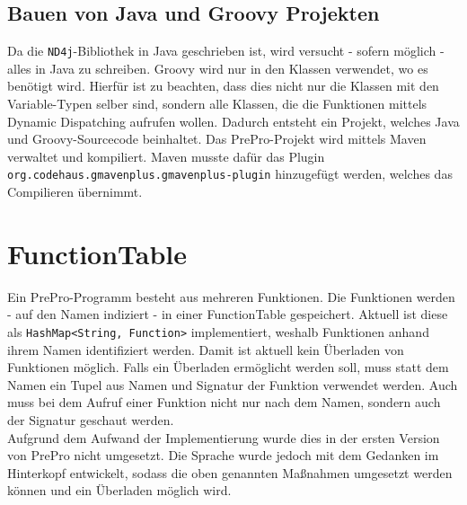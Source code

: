 \subsection{Bauen von Java und Groovy Projekten}
Da die \texttt{ND4j}-Bibliothek in Java geschrieben ist, wird versucht - sofern möglich - alles in Java zu schreiben.
Groovy wird nur in den Klassen verwendet, wo es benötigt wird.
Hierfür ist zu beachten, dass dies nicht nur die Klassen mit den Variable-Typen selber sind, sondern alle Klassen, die die Funktionen mittels Dynamic Dispatching aufrufen wollen.
Dadurch entsteht ein Projekt, welches Java und Groovy-Sourcecode beinhaltet.
Das PrePro-Projekt wird mittels Maven verwaltet und kompiliert.
Maven musste dafür das Plugin \texttt{org.codehaus.gmavenplus.gmavenplus-plugin} hinzugefügt werden, welches das Compilieren übernimmt.

\section{FunctionTable}
Ein PrePro-Programm besteht aus mehreren Funktionen.
Die Funktionen werden - auf den Namen indiziert - in einer FunctionTable gespeichert.
Aktuell ist diese als \texttt{HashMap<String, Function>} implementiert, weshalb Funktionen anhand ihrem Namen identifiziert werden. 
Damit ist aktuell kein Überladen von Funktionen möglich.
Falls ein Überladen ermöglicht werden soll, muss statt dem Namen ein Tupel aus Namen und Signatur der Funktion verwendet werden.
Auch muss bei dem Aufruf einer Funktion nicht nur nach dem Namen, sondern auch der Signatur geschaut werden.\\
Aufgrund dem Aufwand der Implementierung wurde dies in der ersten Version von PrePro nicht umgesetzt.
Die Sprache wurde jedoch mit dem Gedanken im Hinterkopf entwickelt, sodass die oben genannten Maßnahmen umgesetzt werden können und ein Überladen möglich wird.

